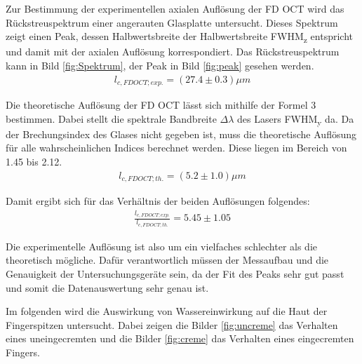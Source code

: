 \documentclass[german, %
parskip=full, %
bibliography=totoc, %
]{scrartcl}
\begin{document}
Zur Bestimmung der experimentellen axialen Auflösung der FD OCT wird das Rückstreuspektrum einer angerauten Glasplatte untersucht. Dieses Spektrum zeigt einen Peak, dessen Halbwertsbreite der Halbwertsbreite FWHM\textsubscript{z} entspricht und damit mit der axialen Auflösung korrespondiert. Das Rückstreuspektrum kann in Bild \ref{fig:Spektrum}, der Peak in Bild \ref{fig:peak} gesehen werden.
\begin{align*}
l_{c, FD OCT; exp.} = (27.4 \pm 0.3) \mu m
\end{align*}

Die theoretische Auflösung der FD OCT lässt sich mithilfe der Formel 3 bestimmen. Dabei stellt die spektrale Bandbreite $\Delta \lambda$ des Lasers FWHM\textsubscript{y} da. Da der Brechungsindex des Glases nicht gegeben ist, muss die theoretische Auflösung für alle wahrscheinlichen Indices berechnet werden. Diese liegen im Bereich von 1.45 bis 2.12. \cite{Brechungsindizes}
\begin{align*}
l_{c, FD OCT; th.} = (5.2 \pm 1.0) \mu m
\end{align*}

Damit ergibt sich für das Verhältnis der beiden Auflösungen folgendes:
\begin{align*}
\frac{l_{c, FD OCT; exp.}}{l_{c, FD OCT; th.}} = 5.45 \pm 1.05
\end{align*}

Die experimentelle Auflösung ist also um ein vielfaches schlechter als die theoretisch mögliche. Dafür verantwortlich müssen der Messaufbau und die Genauigkeit der Untersuchungsgeräte sein, da der Fit des Peaks sehr gut passt und somit die Datenauswertung sehr genau ist. 

Im folgenden wird die Auswirkung von Wassereinwirkung auf die Haut der Fingerspitzen untersucht. Dabei zeigen die Bilder \ref{fig:uncreme} das Verhalten eines uneingecremten und die Bilder \ref{fig:creme} das Verhalten eines eingecremten Fingers. 
\end{document}
